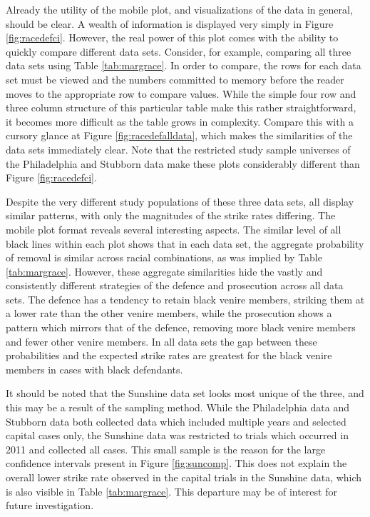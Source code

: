 Already the utility of the mobile plot, and visualizations of the data in general, should be clear. A wealth of information is
displayed very simply in Figure \ref{fig:racedefci}. However, the real power of this plot comes with the ability to quickly
compare different data sets. Consider, for example, comparing all three data sets
using Table \ref{tab:margrace}. In order to compare, the rows for each data set must be viewed and the numbers
committed to memory before the reader moves to the appropriate row to compare values. While the simple four row and three column
structure of this particular table make this rather straightforward,
it becomes more difficult as the table grows
in complexity. Compare this with a cursory glance at Figure \ref{fig:racedefalldata}, which makes the similarities of the data
sets immediately clear. Note that the restricted study sample universes of the Philadelphia and Stubborn data make these plots considerably different than Figure \ref{fig:racedefci}.

Despite the very different study populations of these three data sets, all display similar patterns, with only the
magnitudes of the strike rates differing. The mobile plot format reveals several interesting aspects. The similar level of all black lines within each plot shows that in each data set, the aggregate probability of removal is
similar across racial combinations, as was implied by Table \ref{tab:margrace}. However, these aggregate similarities
hide the vastly and consistently different strategies of the defence and prosecution across all data sets. The defence has a
tendency to retain black venire members, striking them at a lower rate
than the other venire members, while the
prosecution shows a pattern which mirrors that of the defence,
removing more black venire members and fewer other venire members. In
all data sets the gap between these probabilities and the expected strike rates are greatest for the black venire members in cases
with black defendants.

It should be noted that the Sunshine data set looks most unique of the three, and this may be a result of the sampling method. While
the Philadelphia data and Stubborn data both collected data which included multiple years and selected capital cases only, the Sunshine data was restricted to
trials which occurred in 2011 and collected all cases. This small sample is the reason for the large confidence intervals present in Figure
\ref{fig:suncomp}. This does not explain the overall lower strike rate observed in the capital trials in the Sunshine data, which is also
visible in Table \ref{tab:margrace}. This departure may be of interest for future investigation.

